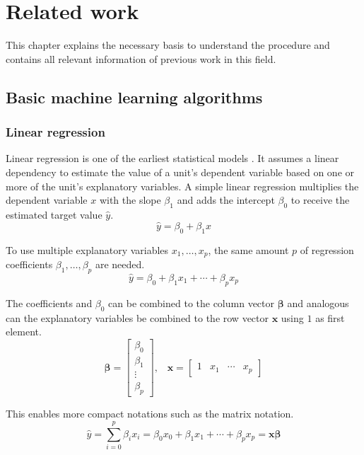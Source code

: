 \chapter{Related work}
This chapter explains the necessary basis to understand the procedure and contains all relevant information of previous work in this field.
\section{Basic machine learning algorithms}

\subsection{Linear regression}
Linear regression is one of the earliest statistical models \autocite{freedman2009}. It assumes a linear dependency to estimate the value of a unit's dependent variable based on one or more of the unit's explanatory variables. A simple linear regression multiplies the dependent variable $x$ with the slope $\beta_1$ and adds the intercept $\beta_0$ to receive the estimated target value $\hat{y}$.
\begin{equation}
    \hat{y} = \beta_0 + \beta_1 x
\end{equation}

To use multiple explanatory variables $x_1, \ldots, x_p$, the same amount $p$ of regression coefficients $\beta_1, \ldots, \beta_p$ are needed.
\begin{equation}
    \hat{y} = \beta_0 + \beta_1 x_1 + \cdots + \beta_p x_p
\end{equation}

The coefficients and $\beta_0$ can be combined to the column vector $\boldsymbol{\beta}$ and analogous can the explanatory variables be combined to the row vector $\mathbf{x}$ using $1$ as first element.
\begin{equation}
    \boldsymbol{\beta} = \begin{bmatrix}\beta_0\\\beta_1\\\vdots\\\beta_p\end{bmatrix}\text{,}\quad
    \mathbf{x} = \begin{bmatrix}1&x_1&\cdots&x_p\end{bmatrix}
\end{equation}

This enables more compact notations such as the matrix notation.
\begin{equation}
    \hat{y} = \sum_{i=0}^p \beta_i x_i = \beta_0 x_0 + \beta_1 x_1 + \cdots + \beta_p x_p = \mathbf{x}\boldsymbol{\beta}
\end{equation}

